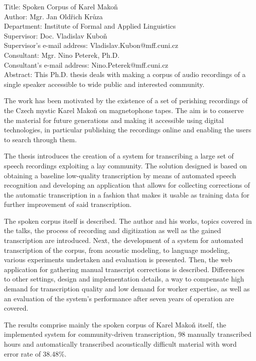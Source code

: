 \noindent
Title: Spoken Corpus of Karel Makoň\\
Author: Mgr. Jan Oldřich Krůza\\
Department: Institute of Formal and Applied Linguistics\\
Supervisor: Doc. Vladislav Kuboň\\
Supervisor's e-mail address: Vladislav.Kubon@mff.cuni.cz\\
Consultant: Mgr. Nino Peterek, Ph.D.\\
Consultant's e-mail address: Nino.Peterek@mff.cuni.cz\\

\noindent Abstract:  This Ph.D. thesis deals with making a corpus of audio
recordings of a single speaker accessible to wide public and interested community.

The work has been motivated by the existence of a set of perishing recordings
of the Czech mystic Karel Makoň on magnetophone tapes. The aim is to conserve
the material for future generations and making it accessible using
digital technologies, in particular publishing the recordings online
and enabling the users to search through them.

The thesis introduces the creation of a system for transcribing a large set of
speech recordings exploiting a lay community. The solution designed is based on
obtaining a baseline low-quality transcription by means of automated speech
recognition and developing an application that allows for collecting corrections
of the automatic transcription in a fashion that makes it usable as training
data for further improvement of said transcription.

The spoken corpus itself is described. The
author and his works, topics covered in the talks, the process of recording
and digitization as well as the gained transcription are introduced.
Next, the development of a system for automated transcription of
the corpus, from acoustic modeling, to language modeling, various experiments
undertaken and evaluation is presented. Then, the web application for gathering
manual transcript corrections is described.
Differences to other settings, design and implementation details, a way to
compensate high demand for transcription quality and low demand for worker
expertise, as well as an evaluation of the system's performance after seven
years of operation are covered.

The results comprise mainly the spoken corpus of Karel Makoň itself,
the implemented system for community-driven transcription,
98 manually transcribed hours
and automatically transcribed acoustically difficult material with word error
rate of 38.48\%.
